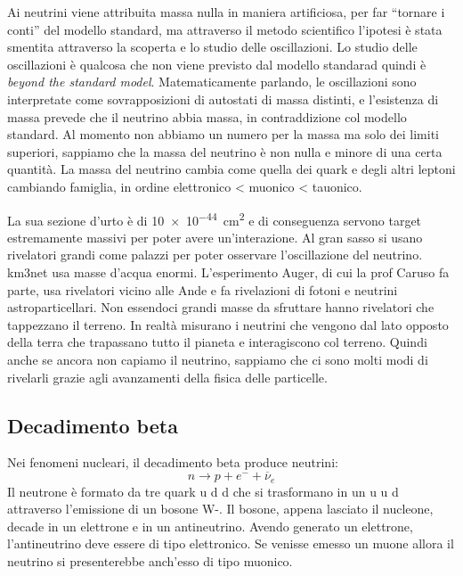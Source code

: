         Ai neutrini viene attribuita massa nulla in maniera artificiosa, per far ``tornare i conti'' del modello standard, ma attraverso il metodo scientifico l'ipotesi è stata smentita attraverso la scoperta e lo studio delle oscillazioni. Lo studio delle oscillazioni è qualcosa che non viene previsto dal modello standarad quindi è \emph{beyond the standard model}. Matematicamente parlando, le oscillazioni sono interpretate come sovrapposizioni di autostati di massa distinti, e l'esistenza di massa prevede che il neutrino abbia massa, in contraddizione col modello standard. Al momento non abbiamo un numero per la massa ma solo dei limiti superiori, sappiamo che la massa del neutrino è non nulla e minore di una certa quantità. La massa del neutrino cambia come quella dei quark e degli altri leptoni cambiando famiglia, in ordine elettronico < muonico < tauonico.

        La sua sezione d'urto è di \SI{10e-44}{\centi\meter\squared} e di conseguenza servono target estremamente massivi per poter avere un'interazione. Al gran sasso si usano rivelatori grandi come palazzi per poter osservare l'oscillazione del neutrino. km3net usa masse d'acqua enormi. L'esperimento Auger, di cui la prof Caruso fa parte, usa rivelatori vicino alle Ande e fa rivelazioni di fotoni e neutrini astroparticellari. Non essendoci grandi masse da sfruttare hanno rivelatori che tappezzano il terreno. In realtà misurano i neutrini che vengono dal lato opposto della terra che trapassano tutto il pianeta e interagiscono col terreno. Quindi anche se ancora non capiamo il neutrino, sappiamo che ci sono molti modi di rivelarli grazie agli avanzamenti della fisica delle particelle.
    \subsection{Decadimento beta}
        Nei fenomeni nucleari, il decadimento beta produce neutrini:
        \begin{equation*}
            n \rightarrow p + e^- + \overline{\nu}_e
        \end{equation*}
        Il neutrone è formato da tre quark u d d che si trasformano in un u u d attraverso l'emissione di un bosone W-. Il bosone, appena lasciato il nucleone, decade in un elettrone e in un antineutrino. Avendo generato un elettrone, l'antineutrino deve essere di tipo elettronico. Se venisse emesso un muone allora il neutrino si presenterebbe anch'esso di tipo muonico.

